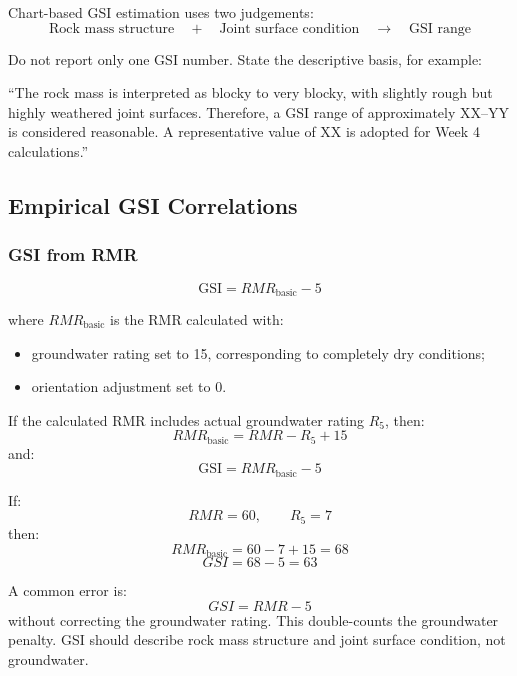 \documentclass[a4paper,12pt]{article}
\begin{document}
Chart-based GSI estimation uses two judgements:
\[
\text{Rock mass structure}
\quad + \quad
\text{Joint surface condition}
\quad \rightarrow \quad
\text{GSI range}
\]

\begin{notebox}
Do not report only one GSI number. State the descriptive basis, for example:

``The rock mass is interpreted as blocky to very blocky, with slightly rough but highly
weathered joint surfaces. Therefore, a GSI range of approximately XX--YY is considered
reasonable. A representative value of XX is adopted for Week 4 calculations.''
\end{notebox}

\subsection{Empirical GSI Correlations}

\subsubsection{GSI from RMR}

\[
\boxed{\text{GSI}=RMR_{\text{basic}}-5}
\]

where \(RMR_{\text{basic}}\) is the RMR calculated with:
\begin{itemize}
    \item groundwater rating set to 15, corresponding to completely dry conditions;
    \item orientation adjustment set to 0.
\end{itemize}

If the calculated RMR includes actual groundwater rating \(R_5\), then:
\[
RMR_{\text{basic}} = RMR - R_5 + 15
\]
and:
\[
\text{GSI} = RMR_{\text{basic}} - 5
\]

\begin{calcbox}[Example]
If:
\[
RMR = 60,\qquad R_5=7
\]
then:
\[
RMR_{\text{basic}} = 60 - 7 + 15 = 68
\]
\[
GSI = 68 - 5 = 63
\]
\end{calcbox}

\begin{warnbox}
A common error is:
\[
GSI = RMR - 5
\]
without correcting the groundwater rating. This double-counts the groundwater penalty.
GSI should describe rock mass structure and joint surface condition, not groundwater.
\end{warnbox}
\end{document}
